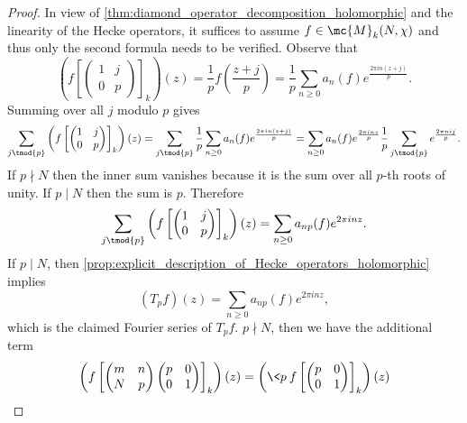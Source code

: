     \begin{proof}
      In view of \cref{thm:diamond_operator_decomposition_holomorphic} and the linearity of the Hecke operators, it suffices to assume $f \in \mc{M}_{k}(N,\chi)$ and thus only the second formula needs to be verified. 
      Observe that
      \[
        \left(f\left[\begin{pmatrix} 1 & j \\ 0 & p \end{pmatrix}\right]_{k}\right)(z) = \frac{1}{p}f\left(\frac{z+j}{p}\right) = \frac{1}{p}\sum_{n \ge 0}a_{n}(f)e^{\frac{2\pi in(z+j)}{p}}.
      \]
      Summing over all $j$ modulo $p$ gives
      \[
        \sum_{j \tmod{p}}\left(f\left[\begin{pmatrix} 1 & j \\ 0 & p \end{pmatrix}\right]_{k}\right)(z) = \sum_{j \tmod{p}}\frac{1}{p}\sum_{n \ge 0}a_{n}(f)e^{\frac{2\pi in(z+j)}{p}} = \sum_{n \ge 0}a_{n}(f)e^{\frac{2\pi inz}{p}}\frac{1}{p}\sum_{j \tmod{p}}e^{\frac{2\pi nij}{p}}.
      \]
      If $p \nmid N$ then the inner sum vanishes because it is the sum over all $p$-th roots of unity. If $p \mid N$ then the sum is $p$. Therefore
      \[
        \sum_{j \tmod{p}}\left(f\left[\begin{pmatrix} 1 & j \\ 0 & p \end{pmatrix}\right]_{k}\right)(z) = \sum_{n \ge 0}a_{np}(f)e^{2\pi inz}.
      \]
      If $p \mid N$, then \cref{prop:explicit_description_of_Hecke_operators_holomorphic} implies
      \begin{equation}\label{equ:Hecke_operator_when_p_divides_holomorphic}
        (T_{p}f)(z) = \sum_{n \ge 0}a_{np}(f)e^{2\pi inz},
      \end{equation}
      which is the claimed Fourier series of $T_{p}f$. $p \nmid N$, then we have the additional term
      \begin{align*}
        \left(f\left[\begin{pmatrix} m & n \\ N & p \end{pmatrix}\begin{pmatrix} p & 0 \\ 0 & 1 \end{pmatrix}\right]_{k}\right)(z) &= \left(\<p\>f\left[\begin{pmatrix} p & 0 \\ 0 & 1 \end{pmatrix}\right]_{k}\right)(z) \\

\end{align*}
\end{proof}
